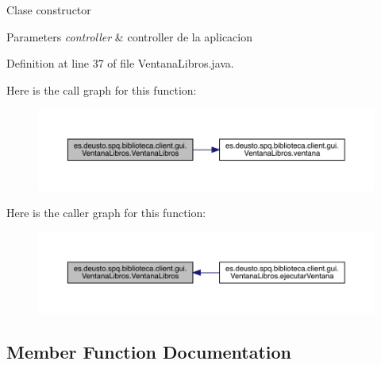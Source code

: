 Clase constructor 
\begin{DoxyParams}{Parameters}
{\em controller} & controller de la aplicacion \\
\hline
\end{DoxyParams}


Definition at line 37 of file Ventana\+Libros.\+java.

Here is the call graph for this function\+:
\nopagebreak
\begin{figure}[H]
\begin{center}
\leavevmode
\includegraphics[width=350pt]{classes_1_1deusto_1_1spq_1_1biblioteca_1_1client_1_1gui_1_1_ventana_libros_adb57377bdb0e3082d1efddafd6aff633_cgraph}
\end{center}
\end{figure}
Here is the caller graph for this function\+:
\nopagebreak
\begin{figure}[H]
\begin{center}
\leavevmode
\includegraphics[width=350pt]{classes_1_1deusto_1_1spq_1_1biblioteca_1_1client_1_1gui_1_1_ventana_libros_adb57377bdb0e3082d1efddafd6aff633_icgraph}
\end{center}
\end{figure}


\subsection{Member Function Documentation}
\mbox{\label{classes_1_1deusto_1_1spq_1_1biblioteca_1_1client_1_1gui_1_1_ventana_libros_af168d6a20e95444277d58e981b8a9372}} 
